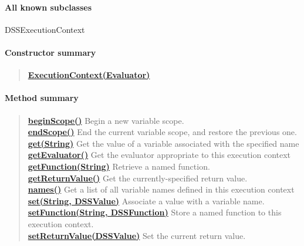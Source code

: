 {{{\paragraph{All known subclasses}{DSSExecutionContext\small{}}
\paragraph{Constructor summary}{
\begin{verse}
\hyperlink{org.openmrs.module.dssmodule.state.ExecutionContext(org.openmrs.module.dssmodule.state.Evaluator)}{{\bf ExecutionContext(Evaluator)}} \\
\end{verse}
}
\paragraph{Method summary}{
\begin{verse}
\hyperlink{org.openmrs.module.dssmodule.state.ExecutionContext.beginScope()}{{\bf beginScope()}} Begin a new variable scope.\\
\hyperlink{org.openmrs.module.dssmodule.state.ExecutionContext.endScope()}{{\bf endScope()}} End the current variable scope, and restore the previous one.\\
\hyperlink{org.openmrs.module.dssmodule.state.ExecutionContext.get(java.lang.String)}{{\bf get(String)}} Get the value of a variable associated with the specified name\\
\hyperlink{org.openmrs.module.dssmodule.state.ExecutionContext.getEvaluator()}{{\bf getEvaluator()}} Get the evaluator appropriate to this execution context\\
\hyperlink{org.openmrs.module.dssmodule.state.ExecutionContext.getFunction(java.lang.String)}{{\bf getFunction(String)}} Retrieve a named function.\\
\hyperlink{org.openmrs.module.dssmodule.state.ExecutionContext.getReturnValue()}{{\bf getReturnValue()}} Get the currently-specified return value.\\
\hyperlink{org.openmrs.module.dssmodule.state.ExecutionContext.names()}{{\bf names()}} Get a list of all variable names defined in this execution context\\
\hyperlink{org.openmrs.module.dssmodule.state.ExecutionContext.set(java.lang.String, org.openmrs.module.dssmodule.value.DSSValue)}{{\bf set(String, DSSValue)}} Associate a value with a variable name.\\
\hyperlink{org.openmrs.module.dssmodule.state.ExecutionContext.setFunction(java.lang.String, org.openmrs.module.dssmodule.state.DSSFunction)}{{\bf setFunction(String, DSSFunction)}} Store a named function to this execution context.\\
\hyperlink{org.openmrs.module.dssmodule.state.ExecutionContext.setReturnValue(org.openmrs.module.dssmodule.value.DSSValue)}{{\bf setReturnValue(DSSValue)}} Set the current return value.\\
\end{verse}
}
}}}

